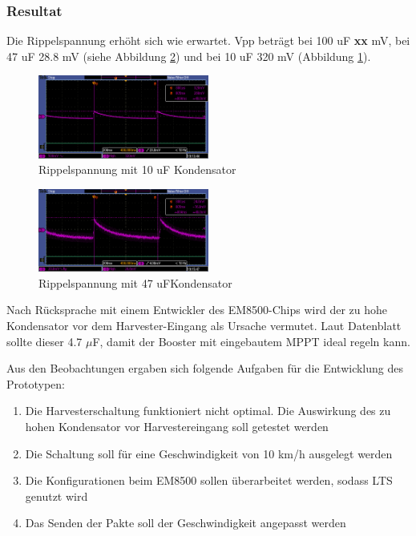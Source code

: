 \subsubsection*{Resultat}

Die Rippelspannung erhöht sich wie erwartet. Vpp beträgt bei 100 uF \textbf{xx} mV, bei 47 uF 28.8 mV (siehe Abbildung \ref{kond47uF}) und bei 10 uF 320 mV (Abbildung \ref{kond10uF}).
 
\begin{figure}[ht]
    \includegraphics[width=0.5\textwidth]{3Vorgehen/imag/10uF.PNG}
    \caption{Rippelspannung mit 10 uF Kondensator}\label{kond10uF} 
\end{figure}

\begin{figure}[ht]
    \includegraphics[width=0.5\textwidth]{3Vorgehen/imag/47uF.PNG}
    \caption{Rippelspannung mit 47 uFKondensator}\label{kond47uF} 
\end{figure}

Nach Rücksprache mit einem Entwickler des EM8500-Chips wird der zu hohe Kondensator vor dem Harvester-Eingang als Ursache vermutet. Laut Datenblatt sollte dieser 4.7 $\mu$F, damit der Booster mit eingebautem MPPT ideal regeln kann.

Aus den Beobachtungen ergaben sich folgende Aufgaben für die Entwicklung des Prototypen:

\begin{enumerate}
    \item Die Harvesterschaltung funktioniert nicht optimal. Die Auswirkung des zu hohen Kondensator vor Harvestereingang soll getestet werden
    \item Die Schaltung soll für eine Geschwindigkeit von 10 km/h ausgelegt werden
    \item Die Konfigurationen beim EM8500 sollen überarbeitet werden, sodass LTS genutzt wird
    \item Das Senden der Pakte soll der Geschwindigkeit angepasst werden
\end{enumerate}

